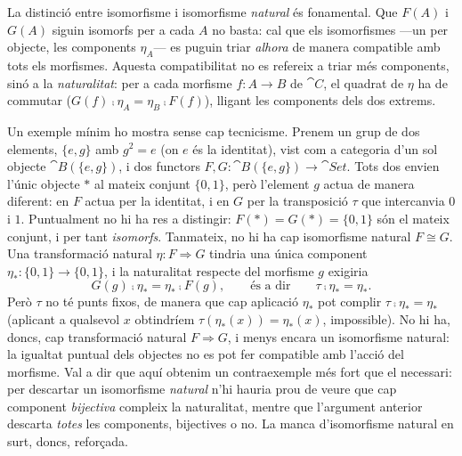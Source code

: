 \begin{observacio}\label{obs:iso-no-natural}
La distinció entre isomorfisme i isomorfisme \emph{natural} és fonamental. Que $F(A)$ i $G(A)$ siguin isomorfs per a cada $A$ no basta: cal que els isomorfismes ---un per objecte, les components $\eta_A$--- es puguin triar \emph{alhora} de manera compatible amb tots els morfismes. Aquesta compatibilitat no es refereix a triar més components, sinó a la \emph{naturalitat}: per a cada morfisme $f\colon A\to B$ de $\cat{C}$, el quadrat de $\eta$ ha de commutar ($G(f)\comp\eta_A=\eta_B\comp F(f)$), lligant les components dels dos extrems.

Un exemple mínim ho mostra sense cap tecnicisme. Prenem un grup de dos elements, $\{e,g\}$ amb $g^2=e$ (on $e$ és la identitat), vist com a categoria d'un sol objecte $\cat{B}(\{e,g\})$, i dos functors $F,G\colon\cat{B}(\{e,g\})\to\cat{Set}$. Tots dos envien l'únic objecte $\ast$ al mateix conjunt $\{0,1\}$, però l'element $g$ actua de manera diferent: en $F$ actua per la identitat, i en $G$ per la transposició $\tau$ que intercanvia $0$ i $1$. Puntualment no hi ha res a distingir: $F(\ast)=G(\ast)=\{0,1\}$ són el mateix conjunt, i per tant \emph{isomorfs}. Tanmateix, no hi ha cap isomorfisme natural $F\cong G$. Una transformació natural $\eta\colon F\Rightarrow G$ tindria una única component $\eta_\ast\colon\{0,1\}\to\{0,1\}$, i la naturalitat respecte del morfisme $g$ exigiria
\[
G(g)\comp\eta_\ast=\eta_\ast\comp F(g),
\qquad\text{és a dir}\qquad
\tau\comp\eta_\ast=\eta_\ast.
\]
Però $\tau$ no té punts fixos, de manera que cap aplicació $\eta_\ast$ pot complir $\tau\comp\eta_\ast=\eta_\ast$ (aplicant a qualsevol $x$ obtindríem $\tau(\eta_\ast(x))=\eta_\ast(x)$, impossible). No hi ha, doncs, cap transformació natural $F\Rightarrow G$, i menys encara un isomorfisme natural: la igualtat puntual dels objectes no es pot fer compatible amb l'acció del morfisme. Val a dir que aquí obtenim un contraexemple més fort que el necessari: per descartar un isomorfisme \emph{natural} n'hi hauria prou de veure que cap component \emph{bijectiva} compleix la naturalitat, mentre que l'argument anterior descarta \emph{totes} les components, bijectives o no. La manca d'isomorfisme natural en surt, doncs, reforçada.


\end{observacio}
